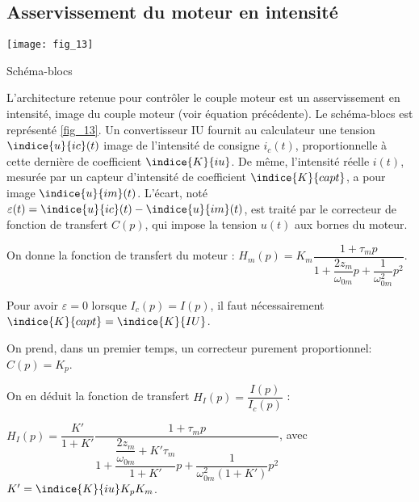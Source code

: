 \subsection*{Asservissement du moteur en intensité}
\ifprof
\else

\begin{marginfigure}
\centering
\texttt{[image: fig\_13]}
\caption{Schéma-blocs \label{fig_13}}
\end{marginfigure}

L’architecture retenue pour contrôler le couple moteur est un asservissement en intensité, image du
couple moteur (voir équation précédente). Le schéma-blocs est représenté \autoref{fig_13}. Un convertisseur IU
fournit au calculateur une tension $\indice{u}{ic}(t)$ image de l’intensité de consigne $i_c(t)$, proportionnelle à cette
dernière de coefficient $\indice{K}{iu}$. De même, l’intensité réelle $i(t)$, mesurée par un capteur d’intensité de
coefficient $\indice{K}{capt}$, a pour image $\indice{u}{im}(t)$. L’écart, noté $\varepsilon(t) = \indice{u}{ic}(t) - \indice{u}{im}(t)$, est traité par le correcteur de fonction de transfert $C(p)$, qui impose la tension $u(t)$ aux bornes du moteur.

On donne la fonction de transfert du moteur : $H_m(p)=K_m\dfrac{1+\tau_m p}{1+\dfrac{2z_m}{\omega_{0m}}p+\dfrac{1}{\omega_{0m}^2}p^2}$.

\fi

\ifprof
\begin{corrige}

Pour avoir $\varepsilon = 0$ lorsque $I_c(p)=I(p)$, il faut nécessairement $\indice{K}{capt}=\indice{K}{IU}$.
\end{corrige}
\else
\fi

\ifprof
\else

On prend, dans un premier temps, un correcteur purement proportionnel: $C(p)=K_p$.

On en déduit la fonction de transfert $H_I(p)=\dfrac{I(p)}{I_c(p)}$ :

$H_I(p)=\dfrac{K'}{1+K'}\dfrac{1+\tau_m p}{1+  
\dfrac{\dfrac{2z_m}{\omega_{0m}}+ K'\tau_m}{1+K'}p 
+ \dfrac{1}{\omega_{0m}^2(1+K')} p^2}$, avec $K'=\indice{K}{iu}K_pK_m$.

